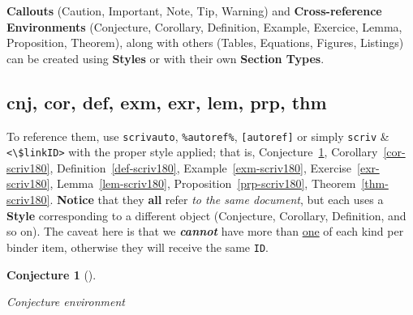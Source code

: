 \documentclass[
  12pt,
  a4paper,
  oneside,
  titlepage,
  toclink=all,
  toc=bibliography]{scrbook}
\theoremstyle{plain}
\theoremstyle{plain}
\theoremstyle{definition}
\theoremstyle{definition}
\theoremstyle{plain}
\theoremstyle{plain}
\theoremstyle{plain}
\newtheorem{conjecture}{Conjecture}[section]
\theoremstyle{definition}
\theoremstyle{remark}
\begin{document}
\begin{tcolorbox}[enhanced jigsaw, bottomtitle=1mm, breakable, opacitybacktitle=0.6, colframe=quarto-callout-tip-color-frame, colback=white, colbacktitle=quarto-callout-tip-color!10!white, leftrule=.75mm, left=2mm, toprule=.15mm, opacityback=0, titlerule=0mm, bottomrule=.15mm, toptitle=1mm, arc=.35mm, title=\textcolor{quarto-callout-tip-color}{\faLightbulb}\hspace{0.5em}{Tip}, rightrule=.15mm, coltitle=black]

\textbf{Callouts} (Caution, Important, Note, Tip, Warning) and
\textbf{Cross-reference Environments} (Conjecture, Corollary,
Definition, Example, Exercice, Lemma, Proposition, Theorem), along with
others (Tables, Equations, Figures, Listings) can be created using
\textbf{Styles} or with their own \textbf{Section Types}.

\end{tcolorbox}

\hypertarget{sec-scriv180}{%
\subsection{cnj, cor, def, exm, exr, lem, prp, thm}\label{sec-scriv180}}

\protect\hypertarget{scriv180}{}{}

To reference them, use \texttt{scrivautο}, \texttt{\%autοref\%},
\texttt{{[}autοref{]}} or simply \texttt{scriv} \&
\texttt{\textless{}\textbackslash{}\$linkID\textgreater{}} with the
proper style applied; that is,
\protect\hypertarget{cite_38}{}{\label{cite_38}Conjecture~\ref{cnj-scriv180}},
\protect\hypertarget{cite_39}{}{\label{cite_39}Corollary~\ref{cor-scriv180}},
\protect\hypertarget{cite_40}{}{\label{cite_40}Definition~\ref{def-scriv180}},
\protect\hypertarget{cite_41}{}{\label{cite_41}Example~\ref{exm-scriv180}},
\protect\hypertarget{cite_42}{}{\label{cite_42}Exercise~\ref{exr-scriv180}},
\protect\hypertarget{cite_43}{}{\label{cite_43}Lemma~\ref{lem-scriv180}},
\protect\hypertarget{cite_44}{}{\label{cite_44}Proposition~\ref{prp-scriv180}},
\protect\hypertarget{cite_45}{}{\label{cite_45}Theorem~\ref{thm-scriv180}}.
\textbf{Notice} that they \textbf{all} refer \emph{to the same
document}, but each uses a \textbf{Style} corresponding to a different
object (Conjecture, Corollary, Definition, and so on). The caveat here
is that we \textbf{\emph{cannot}} have more than \ul{one} of each kind
per binder item, otherwise they will receive the same \texttt{ID}.

\begin{conjecture}[]\protect\hypertarget{cnj-scriv180}{}\label{cnj-scriv180}

Conjecture environment

\end{conjecture}
\end{document}

